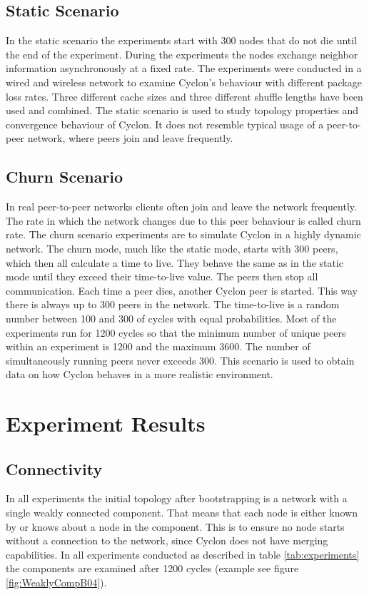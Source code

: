 \subsection{Static Scenario}
In the static scenario the experiments start with 300 nodes that do not die
until the end of the experiment. During the experiments the nodes exchange
neighbor information asynchronously at a fixed rate. The experiments were
conducted in a wired and wireless network to examine Cyclon's behaviour with
different package loss rates. Three different cache sizes and three different
shuffle lengths have been used and combined. The static scenario is used to
study topology properties and convergence behaviour of Cyclon. It does not
resemble typical usage of a peer-to-peer network, where peers join and leave
frequently.
\subsection{Churn Scenario}
In real peer-to-peer networks clients often join and leave the network
frequently. The rate in which the network changes due to this peer behaviour is
called churn rate. The churn scenario experiments are to simulate Cyclon in a
highly dynamic network. The churn mode, much like the static mode, starts with
300 peers, which then all calculate a time to live. They behave the same as in
the static mode until they exceed their time-to-live value. The peers then stop
all communication. Each time a peer dies, another Cyclon peer is started. This
way there is always up to 300 peers in the network. The time-to-live is a random
number between 100 and 300 of cycles with equal probabilities. Most of the
experiments run for 1200 cycles so that the minimum number of unique peers
within an experiment is 1200 and the maximum 3600. The number of simultaneously
running peers never exceeds 300. This scenario is used to obtain data on how
Cyclon behaves in a more realistic environment.

\section{Experiment Results}

\subsection{Connectivity}
In all experiments the initial topology after bootstrapping is a network with a
single weakly connected component. That means that each node is either known by
or knows about a node in the component. This is to ensure no node starts
without a connection to the network, since Cyclon does not have merging
capabilities. In all experiments conducted as described in table
\ref{tab:experiments} the components are examined after 1200 cycles (example
see figure \ref{fig:WeaklyCompB04}).

